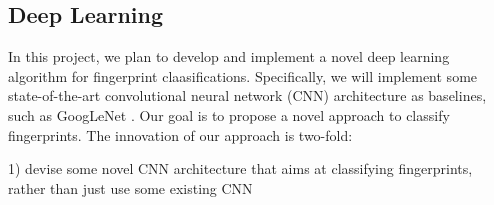 \subsection{Deep  Learning}
In this project, we plan to develop and implement a novel deep learning algorithm for fingerprint claasifications.
%
Specifically, we will implement some state-of-the-art convolutional neural network (CNN) architecture as baselines, such as GoogLeNet \cite{szegedy2016rethinking}.
%
Our goal is to propose a novel approach to classify fingerprints. The innovation of our approach is two-fold:

1) devise some novel CNN architecture that aims at classifying fingerprints, rather than just use some existing CNN

